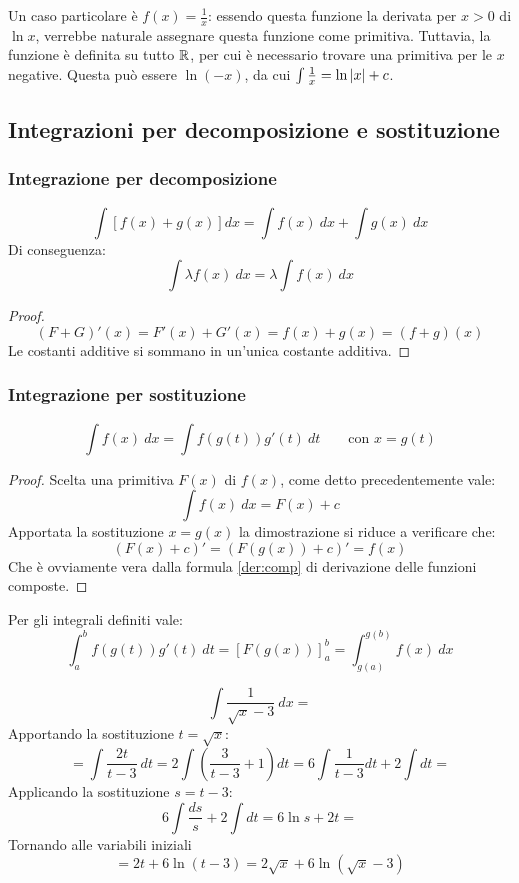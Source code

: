 Un caso particolare è $f(x)=\frac{1}{x}$: essendo questa funzione la derivata per $x>0$ di $\ln x$, verrebbe naturale assegnare questa funzione come primitiva. Tuttavia, la funzione è definita su tutto $\mathbb{R}$, per cui è necessario trovare una primitiva per le $x$ negative. Questa può essere $\ln (-x)$, da cui $\int \frac{1}{x}=\ln\left\lvert x \right\rvert+c$.


\subsection[Decomposizione e sostituzione]{Integrazioni per decomposizione e sostituzione}

\subsubsection{Integrazione per decomposizione}
\begin{prop}
	\[
		\int[f(x)+g(x)]dx = \int f(x)~dx+\int g(x)~dx
	\]
	Di conseguenza:
	\[
		\int \lambda f(x)~dx=\lambda\int f(x)~dx
	\]
\end{prop}
\begin{proof}
	\[
		(F+G)'(x)=F'(x)+G'(x)=f(x)+g(x)=(f+g)(x)
	\]
	Le costanti additive si sommano in un'unica costante additiva.
\end{proof}

\subsubsection{Integrazione per sostituzione}
\begin{prop}
	\label{prop:intsost}
	\[
		\int f(x)~dx=\int f(g(t))g'(t)~dt\qquad\text{con }x=g(t)
	\]
\end{prop}
\begin{proof}
	Scelta una primitiva $F(x)$ di $f(x)$, come detto precedentemente vale:
	\[
		\int f(x)~dx=F(x)+c
	\]
	Apportata la sostituzione $x=g(x)$ la dimostrazione si riduce a verificare che:
	\[
		(F(x)+c)'=(F(g(x))+c)'=f(x)
	\]
	Che è ovviamente vera dalla formula \ref{der:comp} di derivazione delle funzioni composte.
\end{proof}
Per gli integrali definiti vale:
\[
	\int_a^b f(g(t))g'(t)~dt=[F(g(x))]_a^b=\int_{g(a)}^{g(b)} f(x)~dx
\]

\begin{examp}
	\[
		\int \frac{1}{\sqrt{x}-3}~dx=
	\]
	Apportando la sostituzione $t=\sqrt{x}$:
	\[
		=\int\frac{2t}{t-3}~dt=2\int\left(\frac{3}{t-3}+1\right)dt=6\int\frac{1}{t-3}dt+2\int dt=
	\]
	Applicando la sostituzione $s=t-3$:
	\[
		6\int\frac{ds}{s}+2\int dt=6\ln s+2t=
	\]
	Tornando alle variabili iniziali
	\[
		=2t+6\ln(t-3)=2\sqrt{x}+6\ln(\sqrt{x}-3)
	\]
\end{examp}

